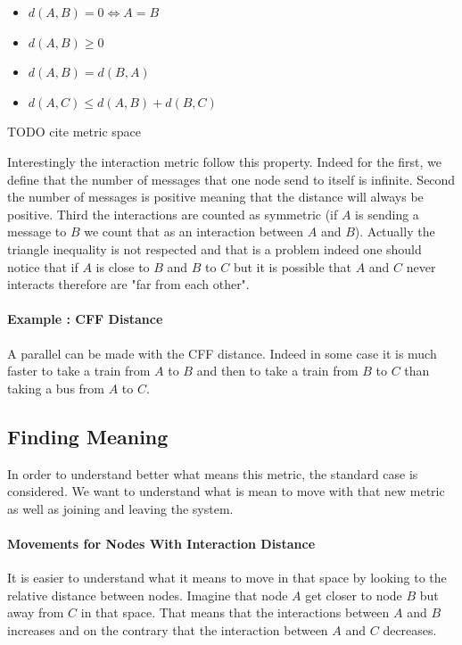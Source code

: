 \documentclass[a4paper,11pt,oneside]{report}
\begin{document}
\begin{itemize}
\item $d(A,B) = 0  \Leftrightarrow A = B$
\item $d(A,B) \geq 0$
\item $d(A,B) = d(B,A)$
\item \color{red} $d(A, C) \leq d(A,B) + d(B,C)$ \color{black}
\end{itemize}
\color{red} TODO cite metric space \color{black}

Interestingly the interaction metric follow this property. Indeed for the
first, we define that the number of messages that one node send to itself is
infinite. Second the number of messages is positive meaning that the distance
will always be positive. Third the interactions are counted as symmetric (if
$A$ is sending a message to $B$ we count that as an interaction between $A$ and
$B$). Actually the triangle inequality is not respected and that is a problem
indeed one should notice that if $A$ is close to $B$ and $B$ to $C$ but it is
possible that $A$ and $C$ never interacts therefore are "far from each other". 

\paragraph{Example :  CFF Distance}
A parallel can be made with the CFF distance. Indeed in some case it is much
faster to take a train from $A$ to $B$ and then to take a train from $B$ to $C$
than taking a bus from $A$ to $C$. 

\subsection{Finding Meaning}
In order to understand better what means this metric, the standard case is
considered. We want to understand what is mean to move with that new metric as
well as joining and leaving the system. 

\paragraph{Movements for Nodes With Interaction Distance}
It is easier to understand what it means to move in that space by looking to
the relative distance between nodes. Imagine that node $A$ get closer to node
$B$ but away from $C$ in that space. That means that the interactions between
$A$ and $B$ increases and on the contrary that the interaction between $A$ and
$C$ decreases.
\end{document}
